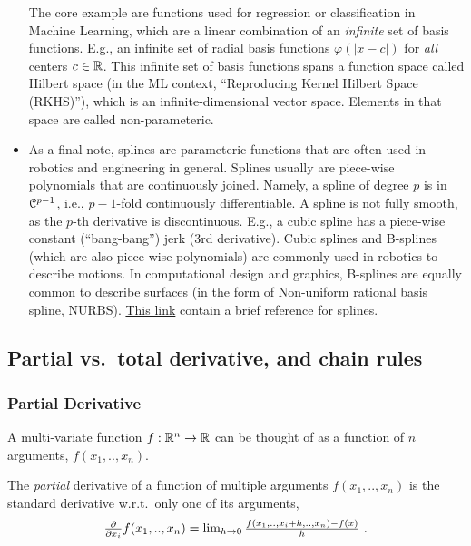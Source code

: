 \begin{itemize}
The core example are functions used for regression or classification in Machine Learning, which are a linear combination of an \emph{infinite} set of basis functions. E.g., an infinite set of radial basis functions $\varphi(|x-c|)$ for \emph{all} centers $c \in {\mathbb{R}}$. This infinite set of basis functions spans a function space called Hilbert space (in the ML context, ``Reproducing Kernel Hilbert Space (RKHS)''), which is an infinite-dimensional vector space. Elements in that space are called non-parameteric.

\item As a final note, splines are parameteric functions that are often used in robotics and engineering in general. Splines usually are piece-wise polynomials that are continuously joined. Namely, a spline of degree $p$ is in ${\cal C}^{p-1}$, i.e., $p-1$-fold continuously differentiable. A spline is not fully smooth, as the $p$-th derivative is discontinuous. E.g., a cubic spline has a piece-wise constant (``bang-bang'') jerk (3rd derivative). Cubic splines and B-splines (which are also piece-wise polynomials) are commonly used in robotics to describe motions. In computational design and graphics, B-splines are equally common to describe surfaces (in the form of Non-uniform rational basis spline, NURBS). \href{https://marctoussaint.github.io/AI-lectures/notes/splines.html}{This link} contain a brief reference for splines.
\end{itemize}


\subsection{Partial vs.\ total derivative, and chain rules}

\subsubsection{Partial Derivative}

A multi-variate function $f: {\mathbb{R}}^n \to {\mathbb{R}}$ can be thought of
as a function of $n$ arguments, $f(x_1,..,x_n)$.

\begin{myDefinition}
The \emph{partial} derivative of a function of multiple arguments
$f(x_1,..,x_n)$ is the standard derivative w.r.t.\ only one of its arguments,
\begin{equation}
\textstyle\frac{\partial}{\partial x_i} f(x_1,..,x_n) = \lim_{h\to
0} \frac{f(x_1,..,x_i+h,..,x_n)-f(x)}{h} ~.
\end{equation}
\end{myDefinition}


